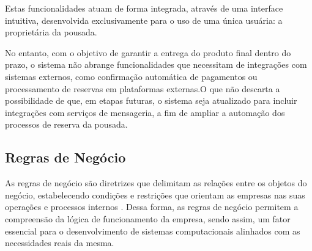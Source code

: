 \documentclass[
	12pt,				%
	openany,			%
	oneside,			%
	a4paper,			%
	english,			%
	french,				%
	spanish,			%
	brazil				%
	]{abntex2}
\begin{document}
Estas funcionalidades atuam de forma integrada, através de uma interface intuitiva, desenvolvida exclusivamente para o uso de uma única usuária: a proprietária da pousada. 

No entanto, com o objetivo de garantir a entrega do produto final dentro do prazo, o sistema não abrange funcionalidades que necessitam de integrações com  sistemas externos, como confirmação automática de pagamentos ou processamento de reservas em plataformas externas.O que não descarta a possibilidade de que, em etapas futuras, o sistema seja atualizado para incluir integrações com serviços de mensageria, a fim de ampliar a automação dos processos de reserva da pousada.

\subsection{Regras de Negócio}
As regras de negócio são diretrizes que delimitam as relações entre os objetos do negócio, estabelecendo condições e restrições que orientam as empresas nas suas operações e processos internos \cite{ibmBusinessRules}. Dessa forma, as regras de negócio permitem a compreensão da lógica de funcionamento da empresa, sendo assim, um fator essencial para o desenvolvimento de sistemas computacionais alinhados com as necessidades reais da mesma.  
\end{document}
